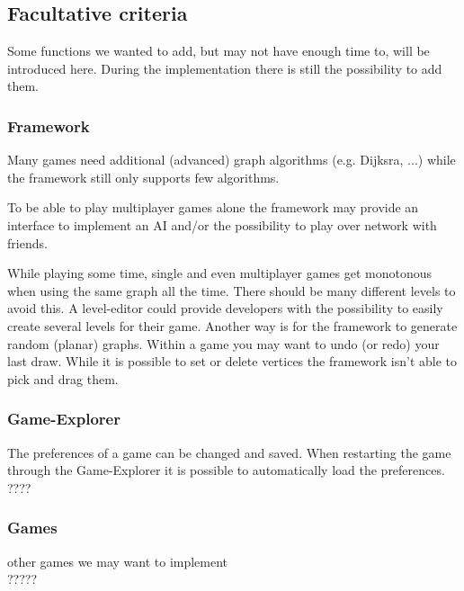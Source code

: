 \subsection{Facultative criteria}
\label{facultative-criteria}
Some functions we wanted to add, but may not have enough time to, will be introduced here. During the implementation there is still the possibility to add them.

\subsubsection{Framework}
Many \glspl{game} need additional (advanced) \gls{graph} \glspl{algorithm} (e.g. Dijksra, ...)	while the \gls{framework} still only supports few algorithms. \par
To be able to play multiplayer games alone the framework may provide an interface to implement an \gls{AI} and/or the possibility to play over network with friends. \par
While playing some time, single and even multiplayer games get monotonous when using the same graph all the time. There should be many different \glspl{level} to avoid this. A \gls{level-editor} could provide \glspl{developer} with the possibility to easily create several levels for their game. Another way is for the framework to generate random (\gls{planar}) graphs.
Within a game you may want to \gls{undo} (or redo) your last draw.
While it is possible to set or delete vertices the framework isn't able to pick and drag them.

\subsubsection{Game-Explorer}
The preferences of a game can be changed and saved. When restarting the game through the Game-Explorer it is possible to automatically load the preferences. \\
????

\subsubsection{Games}
other games we may want to implement \\
?????